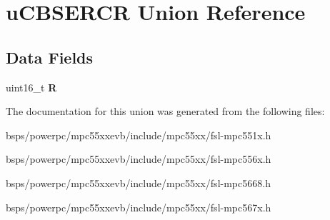 \hypertarget{unionuCBSERCR}{}\section{u\+C\+B\+S\+E\+R\+CR Union Reference}
\label{unionuCBSERCR}
\subsection*{Data Fields}
\begin{DoxyCompactItemize}
\item 
\mbox{\label{unionuCBSERCR_aa11a8d704ba42771fde0ace5bb9fc4a9}} 
uint16\+\_\+t {\bfseries R}
\end{DoxyCompactItemize}


The documentation for this union was generated from the following files\+:\begin{DoxyCompactItemize}
\item 
bsps/powerpc/mpc55xxevb/include/mpc55xx/fsl-\/mpc551x.\+h\item 
bsps/powerpc/mpc55xxevb/include/mpc55xx/fsl-\/mpc556x.\+h\item 
bsps/powerpc/mpc55xxevb/include/mpc55xx/fsl-\/mpc5668.\+h\item 
bsps/powerpc/mpc55xxevb/include/mpc55xx/fsl-\/mpc567x.\+h\end{DoxyCompactItemize}
